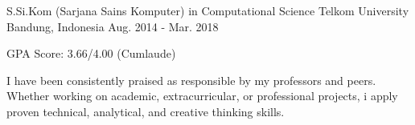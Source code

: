\begin{cventries}

  \cventry
    {S.Si.Kom (Sarjana Sains Komputer) in Computational Science} %
    {Telkom University} %
    {Bandung, Indonesia} %
    {Aug. 2014 - Mar. 2018} %
    {
      \begin{cvitems} %
        \item {GPA Score: 3.66/4.00 (Cumlaude)}
        \item {I have been consistently praised as responsible by my professors and peers. Whether working on academic, extracurricular, or professional projects, i apply proven technical, analytical, and creative thinking skills.}
      \end{cvitems}
    }

\end{cventries}
